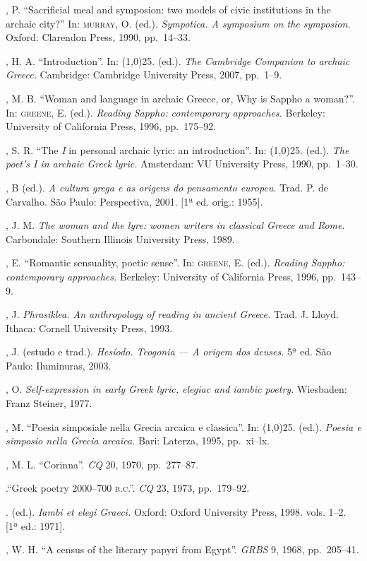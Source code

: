 \begin{bibliohedra}
, P. “Sacrificial meal and symposion: two models of
civic institutions in the archaic city?” In: \textsc{murray}, O. (ed.).
\textit{Sympotica. A symposium on the symposion.} Oxford: Clarendon Press,
1990, pp.~14--33.

, H. A. “Introduction”. In: \line(1,0){25}.
(ed.). \textit{The Cambridge Companion to archaic Greece.} Cambridge: Cambridge
University Press, 2007, pp.~1--9.

, M. B. “Woman and language in archaic Greece, or, Why is Sappho
a woman?”. In: \textsc{greene}, E. (ed.). \textit{Reading Sappho: contemporary
approaches.} Berkeley: University of California Press, 1996, pp.~175--92.

, S. R. “The \textit{I} in personal archaic lyric: an
introduction”. In: \line(1,0){25}. (ed.). \textit{The poet’s I in archaic Greek
lyric.} Amsterdam: VU University Press, 1990, pp.~1--30.

, B (ed.). \textit{A cultura grega e as origens do pensamento
europeu.} Trad. P. de Carvalho. São Paulo: Perspectiva, 2001. [1ª ed. orig.:
1955].

, J. M. \textit{The woman and the lyre: women writers in
classical Greece and Rome}. Carbondale: Southern Illinois University Press,
1989.

, E. “Romantic sensuality, poetic sense”. In: \textsc{greene}, E.
(ed.). \textit{Reading Sappho: contemporary approaches.} Berkeley: University
of California Press, 1996, pp.~143--9.

, J. \textit{Phrasiklea. An anthropology of reading in ancient
Greece.} Trad. J. Lloyd. Ithaca: Cornell University Press, 1993.

, J. (estudo e trad.). \textit{Hesíodo. Teogonia --- A origem dos
deuses.} 5ª ed. São Paulo: Iluminuras, 2003.

, O. \textit{Self-expression in early Greek lyric, elegiac
and iambic poetry.} Wiesbaden: Franz Steiner, 1977.

, M. “Poesia simposiale nella Grecia arcaica e classica”. In:
\line(1,0){25}. (ed.). \textit{Poesia e simposio nella Grecia arcaica.}
Bari: Laterza, 1995, pp.~xi--lx.

, M. L. “Corinna”. \textit{CQ} 20, 1970, pp.~277--87.

\titidem.“Greek poetry 2000--700 \textsc{b.c.”.} \textit{CQ} 23, 1973,
pp.~179--92.

\titidem. (ed.). \textit{Iambi et elegi Graeci.} Oxford: Oxford University
Press, 1998. vols. 1--2. [1ª ed.: 1971].

, W. H. “A census of the literary papyri from Egypt”.
\textit{GRBS} 9, 1968, pp.~205--41.

\end{bibliohedra}

